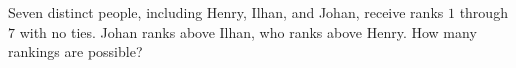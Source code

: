 Seven distinct people, including Henry, Ilhan, and Johan, receive ranks $1$ through $7$ with no ties. Johan ranks above Ilhan, who ranks above Henry. How many rankings are possible?
